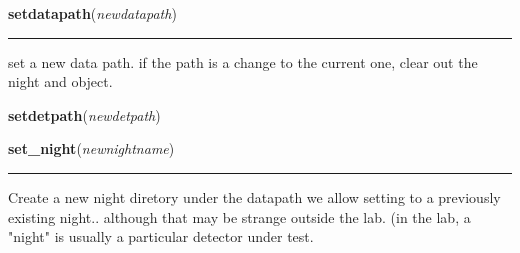     \vspace{0.5ex}

    \begin{boxedminipage}{\textwidth}

    \raggedright \textbf{setdatapath}(\textit{newdatapath})

    \vspace{-1.5ex}

    \rule{\textwidth}{0.5\fboxrule}
    set a new data path. if the path is a change to the current one, clear 
    out the night and object.

    \vspace{1ex}

    \end{boxedminipage}

    \label{xdir:setdetpath}

    \vspace{0.5ex}

    \begin{boxedminipage}{\textwidth}

    \raggedright \textbf{setdetpath}(\textit{newdetpath})

    \vspace{1ex}

    \end{boxedminipage}

    \label{xdir:set_night}

    \vspace{0.5ex}

    \begin{boxedminipage}{\textwidth}

    \raggedright \textbf{set\_night}(\textit{newnightname})

    \vspace{-1.5ex}

    \rule{\textwidth}{0.5\fboxrule}
    Create a new night diretory under the datapath we allow setting to a 
    previously existing night.. although that may be strange outside the 
    lab. (in the lab, a "night" is usually a particular detector under 
    test.

    \vspace{1ex}

    \end{boxedminipage}

    \label{xdir:set_object}

